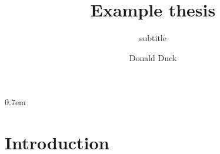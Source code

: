 \documentclass[11pt,doctorate,b5paper]{bth-thesis}
\title{Example thesis}
\subtitle{subtitle}
\author{Donald Duck} %
\begin{document}
\begin{refsection}

\iffullthesis
  \maketitle
\else
  \maketitlepage
  \makeabstractpage
  \makeacknowledgementspage
  \tableofcontents
  \cleardoublepage
  \pagestyle{Ruled}
\fi

\fixchapterstyle
\parskip 0.7em

\chapter{Introduction}
\nocite{Erlandsson1157269}
\lipsum

\printbibliography[heading=subbibliography]
\end{refsection}

\iffullthesis

\fixchapterstyle
%

\fi
\end{document}
